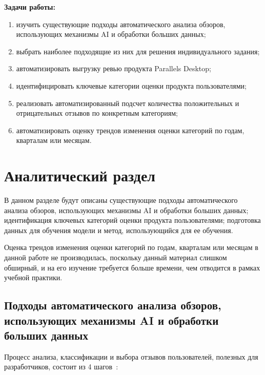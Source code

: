 \documentclass[a4paper,12pt]{article}
\begin{document}
	\textbf{Задачи работы:}
	
	\begin{enumerate}
		\item изучить существующие подходы автоматического анализа обзоров, использующих механизмы AI и обработки больших данных;
		\item выбрать наиболее подходящие из них для решения индивидуального задания;
		\item автоматизировать выгрузку ревью продукта Parallels Desktop;
		\item идентифицировать ключевые категории оценки продукта пользователями;
		\item реализовать автоматизированный подсчет количества положительных и отрицательных отзывов по конкретным категориям;
		\item автоматизировать оценку трендов изменения оценки категорий по годам, кварталам или месяцам.
	\end{enumerate}

	\pagestyle{plain} %
	\pagebreak
	
	\section{Аналитический раздел}
	
	В данном разделе будут описаны существующие подходы автоматического анализа обзоров, использующих механизмы AI и обработки больших данных; идентификация ключевых категорий оценки продукта пользователями; подготовка данных для обучения модели и метод, использующийся для ее обучения.
	
	Оценка трендов изменения оценки категорий по годам, кварталам или месяцам в данной работе не производилась, поскольку данный материал слишком обширный, и на его изучение требуется больше времени, чем отводится в рамках учебной практики.
	
	\subsection{Подходы автоматического анализа обзоров, использующих механизмы AI и обработки больших данных}
	
	Процесс анализа, классификации и выбора отзывов пользователей, полезных для разработчиков, состоит из 4 шагов~\cite{university}:
	
\end{document}
